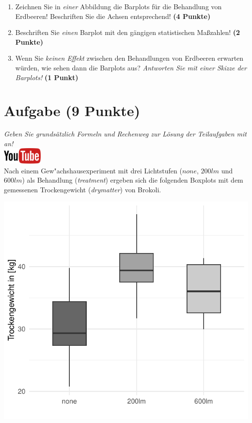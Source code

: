 \documentclass[a4paper, 9pt]{scrartcl}\usepackage[]{graphicx}\usepackage[]{xcolor}
\makeatletter
\def\maxwidth{ %
  \ifdim\Gin@nat@width>\linewidth
    \linewidth
  \else
    \Gin@nat@width
  \fi
}
\makeatother
\begin{document}
\begin{enumerate}
\item Zeichnen Sie in \textit{einer} Abbildung die Barplots f{\"u}r die
  Behandlung von Erdbeeren! Beschriften Sie die Achsen entsprechend!
  \textbf{(4 Punkte)}
\item Beschriften Sie \textit{einen} Barplot mit den g{\"a}ngigen
  statistischen Ma{\ss}zahlen! \textbf{(2 Punkte)}
\item Wenn Sie \textit{keinen Effekt} zwischen den Behandlungen von
  Erdbeeren erwarten w{\"u}rden, wie sehen dann die Barplots aus?
  \textit{Antworten Sie mit einer Skizze der Barplots!}
  \textbf{(1 Punkt)}
\end{enumerate} 
\clearpage

\section{Aufgabe \hfill (9 Punkte)}

\textit{Geben Sie grunds{\"a}tzlich Formeln und Rechenweg zur L{\"o}sung der
  Teilaufgaben mit an!} \\[1Ex]

\hfill\href{https://youtu.be/Xf0yE-o7bEU}{\includegraphics[width = 2cm]{img/youtube}}\\[1Ex] %



Nach einem Gew{"a}chshausexperiment mit drei Lichtstufen ($none$, $200lm$ und $600lm$) als Behandlung
(\textit{treatment}) ergeben sich die folgenden Boxplots mit dem
gemessenen Trockengewicht (\textit{drymatter}) von Brokoli.



{\centering \includegraphics[width=\maxwidth]{img/boxplot-02-zer-1} 

}
\end{document}

